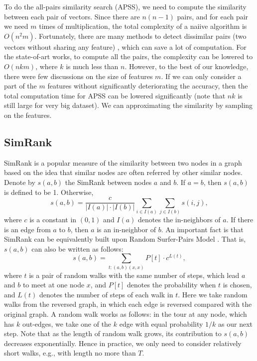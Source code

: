 \documentclass{article}
\begin{document}
To do the all-pairs similarity search (APSS), we need to compute the similarity between each pair of vectors. Since there are $n(n-1)$ pairs, and for each pair we need $m$ times of multiplication, the total complexity of a naiive algorithm is $O(n^2 m)$. Fortunately, there are many methods to detect dissimilar pairs (two vectors without sharing any feature) \cite{ATY13,TAJY14,Lin09}, which can save a lot of computation. For the state-of-art works, to compute all the pairs, the complexity can be lowered to $O(nkm)$, where $k$ is much less than $n$. However, to the best of our knowledge, there were few discussions on the size of features $m$. If we can only consider a part of the $m$ features without significantly deteriorating the accuracy, then the total computation time for APSS can be lowered significantly (note that $nk$ is still large for very big dataset). We can approximating the similarity by sampling on the features.

\subsection{SimRank}
SimRank \cite{JW02} is a popular measure of the similarity between two nodes in a graph based on the idea that similar nodes are often referred by other similar nodes. Denote by $s(a,b)$ the SimRank between nodes $a$ and $b$. If $a=b$, then $s(a,b)$ is defined to be 1. Otherwise, 
$$s(a,b) = \frac{c}{|I(a)|\cdot|I(b)|}\sum_{i\in I(a)}\sum_{j\in I(b)}s(i,j),$$
where $c$ is a constant in $(0,1)$ and $I(a)$ denotes the in-neighbors of $a$. If there is an edge from $a$ to $b$, then $a$ is an in-neighbor of $b$. 
An important fact is that SimRank can be equivalently built upon Random Surfer-Pairs Model \cite{JW02}. That is, $s(a,b)$ can also be written as follows:
$$s(a,b) = \sum_{t: (a,b) (x,x)} P[t]\cdot c^{L(t)},$$
where $t$ is a pair of random walks with the same number of steps, which lead $a$ and $b$ to meet at one node $x$, and $P[t]$ denotes the probability when $t$ is chosen, and $L(t)$ denotes the number of steps of each walk in $t$. Here we take random walks from the reversed graph, in which each edge is reversed compared with the original graph. A random walk works as follows: in the tour at any node, which has $k$ out-edges, we take one of the $k$ edge with equal probability $1/k$ as our next step. Note that as the length of random walk grows, its contribution to $s(a,b)$ decreases exponentially. Hence in practice, we only need to consider relatively short walks, e.g., with length no more than $T$.
\end{document}
